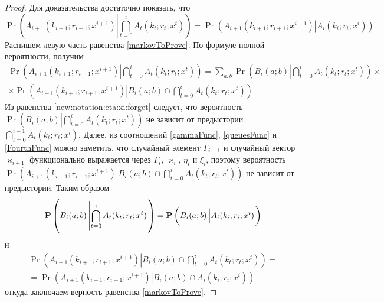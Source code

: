 \documentclass[a4paper,12pt,russian]{extarticle}
\newcommand{\ml}[1]{\begin{multline}#1\end{multline}}
\newcommand{\mll}[1]{\begin{multline*}#1\end{multline*}}
\begin{document}
\begin{proof}
Для доказательства достаточно показать, что 
\begin{equation}
\Pr \left( A_{i+1}(k_{i+1};r_{i+1};x^{i+1}) \left|\bigcap_{t=0}^{i} A_t(k_t;r_t;x^{t})\right.\right) = \Pr \left( A_{i+1}(k_{i+1};r_{i+1};x^{i+1}) \left|A_i(k_i;r_i;x^{i})\right.\right)
\label{markovToProve}
\end{equation}
Распишем левую часть равенства \eqref{markovToProve}. По формуле полной вероятности, получим
\ml
{
\Pr \left( A_{i+1}(k_{i+1};r_{i+1};x^{i+1}) \left|\bigcap_{t=0}^{i} A_t(k_t;r_t;x^{t})\right.\right) 
= \sum_{a,b}\Pr \left( B_i(a;b) \left|\bigcap_{t=0}^{i} A_t(k_t;r_t;x^{t})\right.\right)\times\\
\times \Pr \left( A_{i+1}(k_{i+1};r_{i+1};x^{i+1}) \left|B_i(a;b) \cap \bigcap_{t=0}^{i} A_t(k_t;r_t;x^{t})\right.\right)
\label{markovProof}
}
Из равенства \eqref{new:notation:eta:xi:forget} следует, что вероятность  $\Pr \left( B_i(a;b) \left|\bigcap_{t=0}^{i} A_t(k_t;r_t;x^{t})\right.\right)$ не зависит от предыстории $\bigcap_{t=0}^{i-1} A_t(k_t;r_t;x^{t})$. Далее, из соотношений \eqref{gammaFunc}, \eqref{queuesFunc} и \eqref{FourthFunc} можно заметить, что случайный элемент $\Gamma_{i+1}$ и случайный вектор $\varkappa_{i+1}$ функционально выражается через $\Gamma_i$, $\varkappa_i$, $\eta_i$ и $\xi_i$, поэтому вероятность $\Pr ( A_{i+1}(k_{i+1};r_{i+1};x^{i+1}) |B_i(a;b) \cap \bigcap_{t=0}^{i} A_t(k_t;r_t;x^{t}))$ не зависит от предыстории. Таким образом 
\begin{equation*}
\Pr \left( B_i(a;b) \left|\bigcap_{t=0}^{i} A_t(k_t;r_t;x^{t})\right.\right) = \\
\Pr \left( B_i(a;b) \left| A_i(k_i;r_i;x^{i})\right.\right)
\end{equation*}
и 
\mll
{
\Pr \left( A_{i+1}(k_{i+1};r_{i+1};x^{i+1}) \left|B_i(a;b) \cap \bigcap_{t=0}^{i} A_t(k_t;r_t;x^{t})\right.\right) = \\
=\Pr \left( A_{i+1}(k_{i+1};r_{i+1};x^{i+1}) \left|B_i(a;b) \cap A_i(k_i;r_i;x^{i})\right.\right)
}
откуда заключаем верность равенства \eqref{markovToProve}.
\end{proof}
\end{document}
